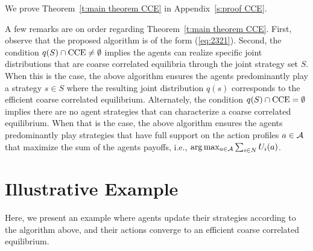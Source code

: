 We prove Theorem~\ref{t:main theorem CCE} in Appendix~\ref{s:proof CCE}.

A few remarks are on order regarding Theorem~\ref{t:main theorem CCE}.  First, observe that the proposed algorithm is of the form (\ref{eq:2321}).  Second, the condition $q(S) \cap {\rm CCE} \neq \emptyset$ implies the agents can realize specific joint distributions that are coarse correlated equilibria through the joint strategy set $S$.  When this is the case, the above algorithm ensures the agents predominantly play a strategy $s \in S$ where the resulting joint distribution $q(s)$ corresponds to the efficient coarse correlated equilibrium.  Alternately, the condition $q(S) \cap {\rm CCE} = \emptyset$ implies there are no agent strategies that can characterize a coarse correlated equilibrium.  When that is the case, the above algorithm  ensures the agents predominantly play strategies that have full support on the action profiles $a \in {\cal A}$ that maximize the sum of the agents payoffs, i.e., $\arg \max_{a \in {\cal A}} \sum_{i \in N} U_i(a)$.

\section{Illustrative Example}\label{s:example}

Here, we present an example where agents update their strategies according to the algorithm above, and their actions converge to an efficient coarse correlated equilibrium.

